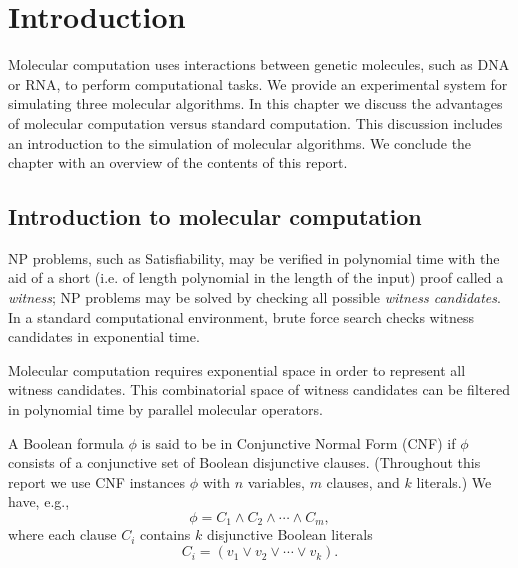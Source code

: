 \chapter{Introduction}


Molecular computation uses interactions between genetic molecules, such as DNA or RNA, to perform computational tasks.  We provide an experimental system for simulating three molecular algorithms.  In this chapter we discuss the advantages of molecular computation versus standard computation.  This discussion includes an introduction to the simulation of molecular algorithms.  We conclude the chapter with an overview of the contents of this report.

\section{Introduction to molecular computation}
	
				
\textsf{NP} problems, such as {\sc Satisfiability}, may be verified in polynomial time with the aid of a short (i.e. of length polynomial in the length of the input) proof called a \textit{witness}; \textsf{NP} problems may be solved by checking all possible \textit{witness candidates}.  In a standard computational environment, brute force search checks witness candidates in exponential time.

Molecular computation requires exponential space in order to represent all witness candidates.  This combinatorial space of witness candidates can be filtered in polynomial time by parallel molecular operators.

A Boolean formula $\phi$ is said to be in Conjunctive Normal Form (CNF) if $\phi$ consists of a conjunctive set of Boolean disjunctive clauses.  (Throughout this report we use CNF instances $\phi$ with $n$ variables, $m$ clauses, and $k$ literals.)  We have, e.g.,
\[
\phi = C_1 \wedge C_2 \wedge \cdots \wedge C_m, 
\]
where each clause $C_i$ contains $k$ disjunctive Boolean literals
\[
C_i = (v_1 \vee v_2 \vee \cdots \vee v_k).
\]


